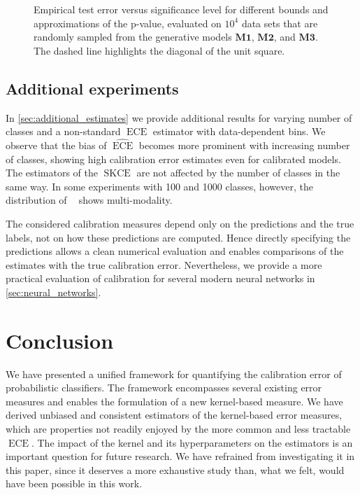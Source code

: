 \documentclass{article}
\DeclareMathOperator{\ECE}{ECE}
\DeclareMathOperator{\squaredkernelmeasure}{SKCE}
\DeclareMathOperator{\linearestimator}{\widehat{SKCE}_{ul}}
\begin{document}
\begin{figure}[!htbp]
  \begin{center}
    
    \caption{Empirical test error versus significance level for different
      bounds and approximations of the p-value, evaluated on $10^4$ data sets
      that are randomly sampled from the generative models $\mathbf{M1}$,
      $\mathbf{M2}$, and $\mathbf{M3}$. The dashed line highlights the diagonal
      of the unit square.}
    \label{fig:pvalues_comparison}
  \end{center}
\end{figure}

\subsection{Additional experiments}

In \cref{sec:additional_estimates} we provide additional results for varying
number of classes and a non-standard $\ECE$ estimator with data-dependent bins.
We observe that the bias of $\widehat{\ECE}$ becomes more prominent with
increasing number of classes, showing high calibration error estimates even for
calibrated models. The estimators of the $\squaredkernelmeasure$ are not
affected by the number of classes in the same way. In some experiments with 100
and 1000 classes, however, the distribution of $\linearestimator$ shows
multi-modality.

The considered calibration measures depend only on the predictions and the
true labels, not on how these predictions are computed. Hence directly
specifying the predictions allows a clean numerical evaluation and enables
comparisons of the estimates with the true calibration error. Nevertheless, we
provide a more practical evaluation of calibration for several modern neural
networks in \cref{sec:neural_networks}.

\section{Conclusion}

We have presented a unified framework for quantifying the calibration error of
probabilistic classifiers. The framework encompasses several existing error
measures and enables the formulation of a new kernel-based measure. We have
derived unbiased and consistent estimators of the kernel-based error measures,
which are properties not readily enjoyed by the more common and less tractable
$\ECE$. The impact of the kernel and its hyperparameters on the estimators is an
important question for future research. We have refrained from investigating it
in this paper, since it deserves a more exhaustive study than, what we felt,
would have been possible in this work.
\end{document}
